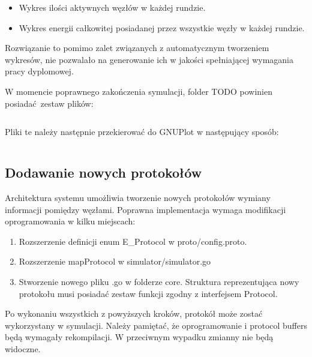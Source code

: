 \documentclass[a4paper,12pt,twoside,openany]{report}
\begin{document}
\begin{itemize}
 \item Wykres ilości aktywnych węzłów w każdej rundzie.
 \item Wykres energii całkowitej posiadanej przez wszystkie węzły w każdej rundzie.
\end{itemize}

Rozwiązanie to pomimo zalet związanych z automatycznym tworzeniem wykresów, nie pozwalało na generowanie ich w jakości spełniającej
wymagania pracy dyplomowej.

W momencie poprawnego zakończenia symulacji, folder TODO powinien posiadać zestaw plików:

\begin{lstlisting}
\end{lstlisting}

Pliki te należy następnie przekierować do GNUPlot w następujący sposób:


\begin{lstlisting}
\end{lstlisting}

\subsection{Dodawanie nowych protokołów}

Architektura systemu umożliwia tworzenie nowych protokołów wymiany informacji pomiędzy węzłami.
Poprawna implementacja wymaga modifikacji oprogramowania w kilku miejscach:

\begin{enumerate}
 \item Rozszerzenie definicji enum E\_Protocol w proto/config.proto.
 \item Rozszerzenie mapProtocol w simulator/simulator.go
 \item Stworzenie nowego pliku .go w folderze core. Struktura reprezentująca nowy protokołu musi posiadać zestaw funkcji zgodny z interfejsem Protocol.
\end{enumerate}

Po wykonaniu wszystkich z powyższych kroków, protokół może zostać wykorzystany w symulacji.
Należy pamiętać, że oprogramowanie i protocol buffers będą wymagały rekompilacji. W przeciwnym wypadku zmianny nie będą widoczne.

\end{document}
